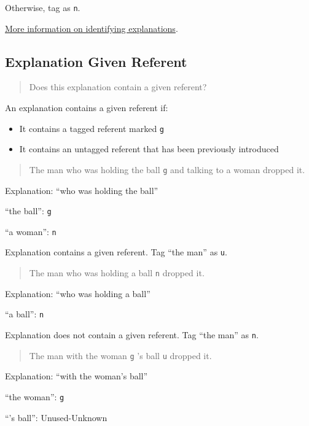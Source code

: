 \documentclass[
]{book}
\providecommand{\tightlist}{%
  \setlength{\itemsep}{0pt}\setlength{\parskip}{0pt}}
\begin{document}
Otherwise, tag as \texttt{n}.

\protect\hyperlink{referent-explanations}{More information on identifying explanations}.

\hypertarget{explanation-given-referent}{%
\subsection{Explanation Given Referent}\label{explanation-given-referent}}

\begin{quote}
Does this explanation contain a given referent?
\end{quote}

An explanation contains a given referent if:

\begin{itemize}
\tightlist
\item
  It contains a tagged referent marked \texttt{g}
\item
  It contains an untagged referent that has been previously introduced
\end{itemize}

\begin{quote}
The man who was holding the ball \texttt{g} and talking to a woman dropped it.
\end{quote}

Explanation: ``who was holding the ball''

``the ball'': \texttt{g}

``a woman'': \texttt{n}

Explanation contains a given referent.
Tag ``the man'' as \texttt{u}.

\begin{quote}
The man who was holding a ball \texttt{n} dropped it.
\end{quote}

Explanation: ``who was holding a ball''

``a ball'': \texttt{n}

Explanation does not contain a given referent.
Tag ``the man'' as \texttt{n}.

\begin{quote}
The man with the woman \texttt{g} 's ball \texttt{u} dropped it.
\end{quote}

Explanation: ``with the woman's ball''

``the woman'': \texttt{g}

``'s ball'': Unused-Unknown
\end{document}
